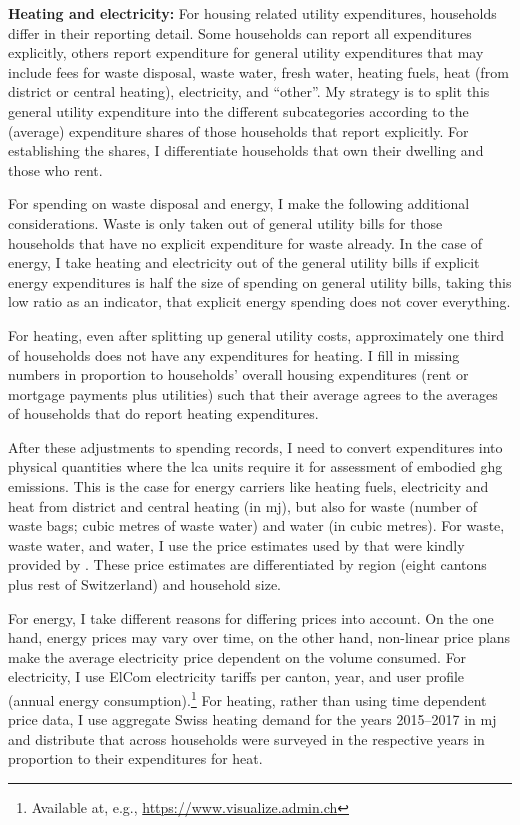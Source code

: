 \documentclass[a4paper,11pt,abstract=true]{scrartcl}
\begin{document}
{\bfseries Heating and electricity:}
For housing related utility expenditures, households differ in their reporting detail.
Some households can report all expenditures explicitly, others report expenditure for general utility expenditures that may include fees for waste disposal, waste water, fresh water, heating fuels, heat (from district or central heating), electricity, and ``other''.
My strategy is to split this general utility expenditure into the different subcategories according to the (average) expenditure shares of those households that report explicitly.
For establishing the shares, I differentiate households that own their dwelling and those who rent.

For spending on waste disposal and energy, I make the following additional considerations.
Waste is only taken out of general utility bills for those households that have no explicit expenditure for waste already.
In the case of energy, I take heating and electricity out of the general utility bills if explicit energy expenditures is half the size of spending on general utility bills, taking this low ratio as an indicator, that explicit energy spending does not cover everything.

For heating, even after splitting up general utility costs, approximately one third of households does not have any expenditures for heating.
I fill in missing numbers in proportion to households' overall housing expenditures (rent or mortgage payments plus utilities) such that their average agrees to the averages of households that do report heating expenditures.

After these adjustments to spending records, I need to convert expenditures into physical quantities where the \ac{lca} units require it for assessment of embodied \ac{ghg} emissions.
This is the case for energy carriers like heating fuels, electricity and heat from district and central heating (in \ac{mj}), but also for waste (number of waste bags; cubic metres of waste water) and water (in cubic metres).
For waste, waste water, and water, I use the price estimates used by \citet{froemelt_using_2018} that were kindly provided by \citeauthor{jakobs_nfp73_2023}.
These price estimates are differentiated by region (eight cantons plus rest of Switzerland) and household size.

For energy, I take different reasons for differing prices into account.
On the one hand, energy prices may vary over time, on the other hand, non-linear price plans make the average electricity price dependent on the volume consumed.
For electricity, I use ElCom electricity tariffs per canton, year, and user profile (annual energy consumption).\footnote{Available at, e.g., \url{https://www.visualize.admin.ch}}
For heating, rather than using time dependent price data, I use aggregate Swiss heating demand for the years 2015--2017 in \ac{mj} and distribute that across households were surveyed in the respective years in proportion to their expenditures for heat.
\end{document}
